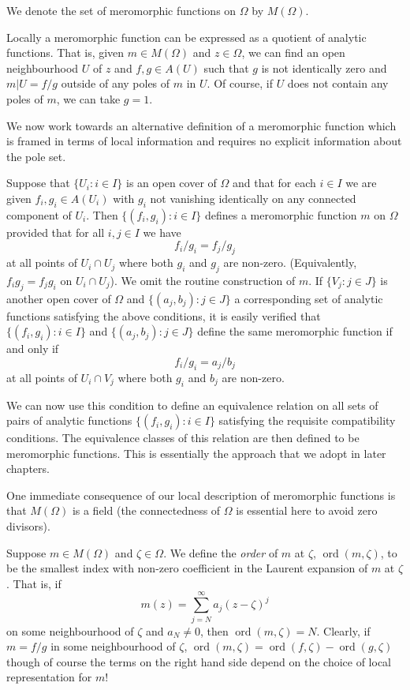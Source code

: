 We denote the set of meromorphic functions on $\Omega$ by $M(\Omega)$.

Locally a meromorphic function can be expressed as a quotient of analytic functions. That is, given $m\in M(\Omega)$ and $z\in\Omega$, we can find an open neighbourhood $U$ of $z$ and $f,g\in A(U)$ such that $g$ is not identically zero and $m|U=f/g$ outside of any poles of $m$ in $U$. Of course, if $U$ does not contain any poles of $m$, we can take $g=1$.

We now work towards an alternative definition of a meromorphic function which is framed in terms of local information and requires no explicit information about the pole set.

Suppose that $\{U_i:i\in I\}$ is an open cover of $\Omega$ and that for each $i\in I$ we are given $f_i,g_i\in A(U_i)$ with $g_i$ not vanishing identically on any connected component of $U_i$. Then $\{(f_i,g_i):i\in I\}$ defines a meromorphic function $m$ on $\Omega$ provided that for all $i,j\in I$ we have
\[ f_i/g_i=f_j/g_j \]
at all points of $U_i\cap U_j$ where both $g_i$ and $g_j$ are non-zero. (Equivalently, $f_i g_j=f_j g_i$ on $U_i\cap U_j$). We omit the routine construction of $m$. If
$\{V_j:j\in J\}$ is another open cover of $\Omega$ and $\{(a_j,b_j):j\in J\}$ a corresponding set of analytic functions satisfying the above conditions, it is easily verified that $\{(f_i,g_i):i\in I\}$ and $\{(a_j,b_j):j\in J\}$ define the same meromorphic function if and only if
\[ f_i/g_i=a_j/b_j \]
at all points of $U_i\cap V_j$ where both $g_i$ and $b_j$ are non-zero.

We can now use this condition to define an equivalence relation on all sets of pairs of analytic functions $\{(f_i,g_i):i\in I\}$ satisfying the requisite compatibility conditions. The equivalence classes of this relation are then defined to be meromorphic functions. This is essentially the approach that we adopt in later chapters.

One immediate consequence of our local description of meromorphic functions is that $M(\Omega)$ is a field (the connectedness of $\Omega$ is essential here to avoid zero divisors).

Suppose $m\in M(\Omega)$ and $\zeta\in\Omega$. We define the \emph{order} of $m$ at $\zeta$, $\operatorname{ord}(m,\zeta)$, to be the smallest index with non-zero coefficient in the Laurent expansion of $m$ at $\zeta$. That is, if
\[ m(z)=\sum_{j=N}^{\infty}a_j(z-\zeta)^j \]
on some neighbourhood of $\zeta$ and $a_N\ne0$, then $\operatorname{ord}(m,\zeta)=N$. Clearly, if $m=f/g$ in some neighbourhood of $\zeta$, $\operatorname{ord}(m,\zeta)=\operatorname{ord}(f,\zeta)-\operatorname{ord}(g,\zeta)$ though of course the terms on the right hand side depend on the choice of local representation for $m$!

